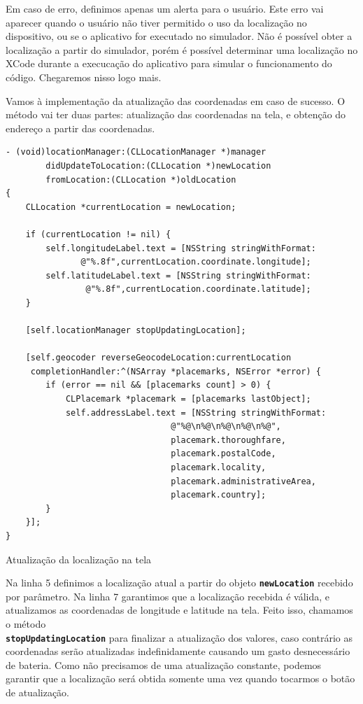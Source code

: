 \documentclass[a4paper,12pt,brazil,doubleside]{book}
\begin{document}
\begin{singlespace}
Em caso de erro, definimos apenas um alerta para o usuário. Este erro vai aparecer quando o usuário não tiver permitido o uso da localização no dispositivo, ou se o aplicativo for executado no simulador. Não é possível obter a localização a partir do simulador, porém é possível determinar uma localização no XCode durante a execucação do aplicativo para simular o funcionamento do código. Chegaremos nisso logo mais.

Vamos à implementação da atualização das coordenadas em caso de sucesso. O método vai ter duas partes: atualização das coordenadas na tela, e obtenção do endereço a partir das coordenadas.

\begin{listing}[H]
\begin{verbatim}
- (void)locationManager:(CLLocationManager *)manager
        didUpdateToLocation:(CLLocation *)newLocation
        fromLocation:(CLLocation *)oldLocation
{
    CLLocation *currentLocation = newLocation;
    
    if (currentLocation != nil) {
        self.longitudeLabel.text = [NSString stringWithFormat:
               @"%.8f",currentLocation.coordinate.longitude];
        self.latitudeLabel.text = [NSString stringWithFormat:
                @"%.8f",currentLocation.coordinate.latitude];
    }
    
    [self.locationManager stopUpdatingLocation];
    
    [self.geocoder reverseGeocodeLocation:currentLocation
     completionHandler:^(NSArray *placemarks, NSError *error) {
        if (error == nil && [placemarks count] > 0) {
            CLPlacemark *placemark = [placemarks lastObject];
            self.addressLabel.text = [NSString stringWithFormat:
                                 @"%@\n%@\n%@\n%@\n%@",
                                 placemark.thoroughfare,
                                 placemark.postalCode,
                                 placemark.locality,
                                 placemark.administrativeArea,
                                 placemark.country];
        }
    }];
}
\end{verbatim}
\caption{Atualização da localização na tela}
\end{listing}


Na linha 5 definimos a localização atual a partir do objeto \texttt{\textbf{newLocation}} recebido por parâmetro. Na linha 7 garantimos que a localização recebida é válida, e atualizamos as coordenadas de longitude e latitude na tela. Feito isso, chamamos o método\\ \texttt{\textbf{stopUpdatingLocation}} para finalizar a atualização dos valores, caso contrário as coordenadas serão atualizadas indefinidamente causando um gasto desnecessário de bateria. Como não precisamos de uma atualização constante, podemos garantir que a localização será obtida somente uma vez quando tocarmos o botão de atualização.


\end{singlespace}
\end{document}
